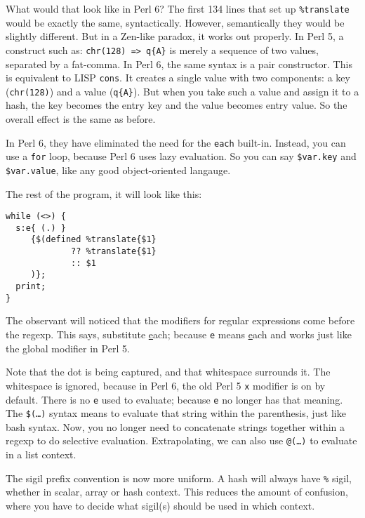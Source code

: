 \documentclass{article}
\newenvironment{example}
  {\addtolength{\linewidth}{-\parindent}%
   \null\begin{minipage}{\linewidth}}
  {\end{minipage}\addtolength{\linewidth}{\parindent}\null}
\begin{document}
What would that look like in Perl 6?  The first 134 lines that set up
\verb'%translate' would be exactly the same, syntactically.  However,
semantically they would be slightly different.  But in a Zen-like
paradox, it works out properly.  In Perl 5, a construct such as:
\verb'chr(128) => q{A}' is merely a sequence of two values, separated by
a fat-comma.  In Perl 6, the same syntax is a pair constructor.  This is
equivalent to LISP \verb'cons'.  It creates a single value with two
components: a key (\verb'chr(128)') and a value (\verb'q{A}').  But when
you take such a value and assign it to a hash, the key becomes the entry
key and the value becomes entry value.  So the overall effect is the
same as before.

In Perl 6, they have eliminated the need for the \verb'each' built-in.
Instead, you can use a \verb'for' loop, because Perl
6 uses lazy evaluation.  So you can say \verb'$var.key' and
\verb'$var.value', like any good object-oriented langauge.

\begin{example}
The rest of the program, it will look like this:
\begin{verbatim}
while (<>) {
  s:e{ (.) }
     {$(defined %translate{$1}
             ?? %translate{$1}
             :: $1
     )};
  print;
}

\end{verbatim}
\end{example}

The observant will noticed that the modifiers for regular expressions
come before the regexp.  This says, substitute \underline{e}ach; because 
\verb'e' means \underline{e}ach and works just like the \underline{g}lobal
modifier in Perl 5.

Note that the dot is being captured, and that whitespace surrounds it.
The whitespace is ignored, because in Perl 6, the old Perl 5 \verb'x'
modifier is on by default.  There is no \verb'e' used to evaluate;
because \verb'e' no longer has that meaning.  The \texttt{\$(\ldots)}
syntax means to evaluate that string within the parenthesis, just like
bash syntax.  Now, you no longer need to concatenate strings together
within a regexp to do selective evaluation.  Extrapolating, we can also 
use \texttt{@(\dots)} to evaluate in a list context.

The sigil prefix convention is now more uniform.  A hash will always 
have \verb'%' sigil, whether in scalar,
array or hash context.  This reduces the amount of confusion, where you
have to decide what sigil(s) should be used in which context.
\end{document}
